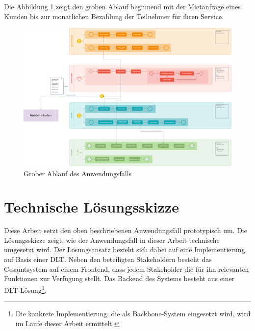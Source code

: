 Die Abbildung \ref{fig:chapter04:usecase_workflow} zeigt den groben Ablauf beginnend mit der Mietanfrage eines Kunden bis zur monatlichen Bezahlung der Teilnehmer für ihren Service.

\begin{figure}[htbp]
 \centering
 \includegraphics[width=1.0\textwidth]{gfx/IOT-Anwendungsfall_Ablauf.png}
 \caption{Grober Ablauf des Anwendungsfalls}
 \label{fig:chapter04:usecase_workflow}
\end{figure}

%
%
\section{Technische Lösungsskizze}
\label{sec:iot_usecase:solution}
Diese Arbeit setzt den oben beschriebenen Anwendungsfall prototypisch um. Die Lösungsskizze zeigt, wie der Anwendungsfall in dieser Arbeit technische umgesetzt wird. Der Lösungsansatz bezieht sich dabei auf eine Implementierung auf Basis einer \ac{DLT}. Neben den beteiligten Stakeholdern besteht das Gesamtsystem auf einem Frontend, dass jedem Stakeholder die für ihn relevanten Funktionen zur Verfügung stellt. Das Backend des Systems besteht aus einer \ac{DLT}-Lösung\footnote{Die konkrete Implementierung, die als Backbone-System eingesetzt wird, wird im Laufe dieser Arbeit ermittelt.}.

